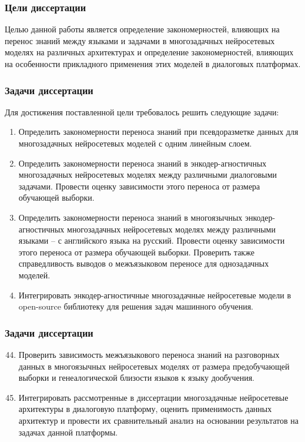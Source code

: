 \begin{frame}
    \setcounter{framenumber}{1}
    \maketitle
\end{frame}


\begin{frame}
    \frametitle{Цели диссертации}
Целью данной работы является определение закономерностей, влияющих на перенос знаний между языками и задачами в многозадачных нейросетевых моделях на различных архитектурах и определение закономерностей, влияющих на особенности прикладного применения этих моделей в диалоговых платформах.
\end{frame}

\begin{frame}
\frametitle{Задачи диссертации}
Для достижения поставленной цели требовалось решить следующие задачи:
\newline
\newline
\begin{enumerate}
  \item {Определить закономерности переноса знаний при псевдоразметке данных для многозадачных нейросетевых моделей с одним линейным слоем.}
  \item {Определить закономерности переноса знаний в энкодер-агностичных многозадачных нейросетевых моделях между различными диалоговыми задачами. Провести оценку зависимости этого переноса от размера обучающей выборки.}
  \item {Определить закономерности переноса знаний в многоязычных энкодер-агностичных многозадачных нейросетевых моделях между различными языками -- с английского языка на русский. Провести оценку зависимости этого переноса от размера обучающей выборки. Проверить также справедливость выводов о межъязыковом переносе для однозадачных моделей.}
  \item{Интегрировать энкодер-агностичные многозадачные нейросетевые модели в open-source библиотеку для решения задач машинного обучения.}
\end{enumerate}
\end{frame}

\begin{frame}
\frametitle{Задачи диссертации}
\begin{enumerate}
\setcounter{enumi}{43}
  \item {Проверить зависимость межъязыкового переноса знаний на разговорных данных в многоязычных нейросетевых моделях от размера предобучающей выборки и генеалогической близости языков к языку дообучения.}
  \item{Интегрировать рассмотренные в диссертации многозадачные нейросетевые архитектуры в диалоговую платформу, оценить применимость данных архитектур и провести их сравнительный анализ на основании результатов на задачах данной платформы. }
\end{enumerate}
\end{frame}


